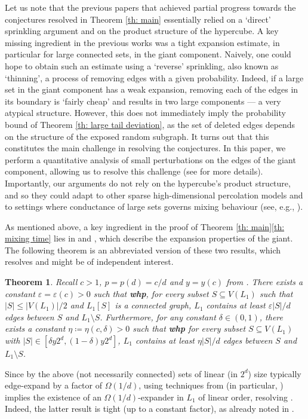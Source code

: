 \documentclass[reqno,final,a4paper]{amsart}
\newtheorem{theorem}{Theorem}
\theoremstyle{definition}
\def\eps{\varepsilon}
\newcommand{\1}{\mathbbm{1}}
\begin{document}
Let us note that the previous papers \cite{DEKK24,EKK22} that achieved partial progress towards the conjectures resolved in Theorem \ref{th: main} essentially relied on a `direct' sprinkling argument and on the product structure of the hypercube. A key missing ingredient in the previous works was a tight expansion estimate, in particular for large connected sets, in the giant component. Naively, one could hope to obtain such an estimate using a `reverse' sprinkling, also known as `thinning', a process of removing edges with a given probability.
Indeed, if a large set in the giant component has a weak expansion, removing each of the edges in its boundary is `fairly cheap' and results in two large components --- a very atypical structure. However, this does not immediately imply the probability bound of Theorem \ref{th: large tail deviation}, as the set of deleted edges depends on the structure of the exposed random subgraph. It turns out that this constitutes the main challenge in resolving the conjectures. In this paper, we perform a quantitative analysis of small perturbations on the edges of the giant component, allowing us to resolve this challenge (see  for more details). Importantly, our arguments do not rely on the hypercube's product structure, and so they could adapt to other sparse high-dimensional percolation models and to settings where conductance of large sets governs mixing behaviour (see, e.g., \cite{AKLP23,AKP21,BBY08,CS24,JKM24,MD18,MMJ24,OCo98}).

As mentioned above, a key ingredient in the proof of Theorem \ref{th: main}\ref{th: mixing time} lies in  and , which describe the expansion properties of the giant. The following theorem is an abbreviated version of these two results, which resolves \cite[Question 5.1]{EKK22} and might be of independent interest.
\begin{theorem}\label{th: expansion}
Recall $c > 1$, $p=p(d)=c/d$ and $y=y(c)$ from . There exists a constant $\eps=\eps(c)>0$ such that \textbf{whp}, for every subset $S\subseteq V(L_1)$ such that $|S|\le |V(L_1)|/2$ and $L_1[S]$ is a connected graph, $L_1$ contains at least $\eps |S|/d$ edges between $S$ and $L_1\setminus S$.
Furthermore, for any constant $\delta\in(0,1)$, there exists a constant $\eta\coloneqq \eta(c,\delta)>0$ such that \textbf{whp} for every subset $S\subseteq V(L_1)$ with $|S|\in [\delta y 2^d,(1-\delta) y 2^d]$, $L_1$ contains at least $\eta |S|/d$ edges between $S$ and $L_1\setminus S$.
\end{theorem}
Since by the above (not necessarily connected) sets of linear (in $2^d$) size typically edge-expand by a factor of $\Omega(1/d)$, using techniques from \cite{K19} (in particular, \cite[Lemma 2.6 and Theorem~2.7]{K19}) implies the existence of an $\Omega(1/d)$-expander in $L_1$ of linear order, resolving \cite[Question 5.1]{EKK22}. Indeed, the latter result is tight (up to a constant factor), as already noted in \cite[Claim 5.2]{EKK22}.
\end{document}
